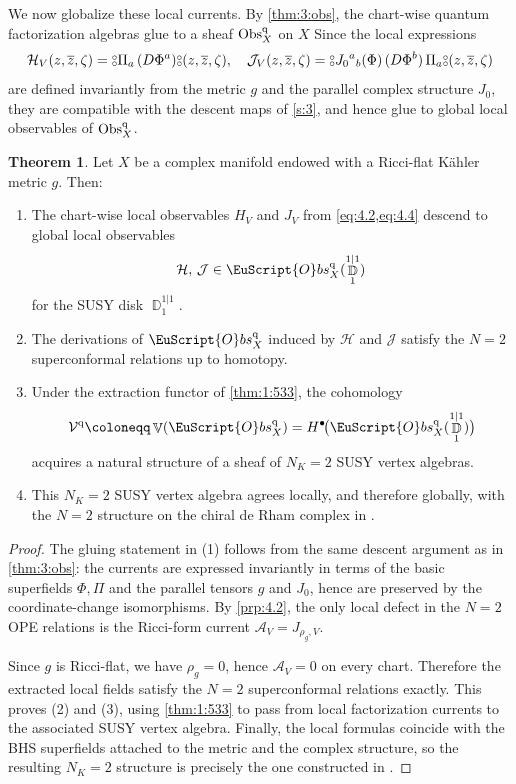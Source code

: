\documentclass[final,reqno]{amsart}
\numberwithin{equation}{section}
\theoremstyle{definition}
\newtheorem{thm}{Theorem}[section]
\newcommand{\ol}{\overline}
\newcommand{\ceq}{\coloneqq} %
\newcommand{\q}{\textup{q}}
\newcommand{\clA}{\mathcal{A}}
\newcommand{\clH}{\mathcal{H}}
\newcommand{\clJ}{\mathcal{J}}
\newcommand{\clV}{\mathcal{V}}
\newcommand{\qObs}[1]{\mathop{\Obs^{\textup{q}}_{#1}}}
\newcommand{\sqObs}[1]{\mathop{\EuScript{O}bs^{\q}_{#1}}}
\newcommand{\dbc}{%
 \mathrel{\vcenter{\hbox{\ooalign{%
  \raisebox{0.5ex}{$\scriptstyle \circ$}\cr%
  \raisebox{-0.5ex}{$\scriptstyle \circ$}%
 }}}}%
}
\newcommand{\nod}[1]{\mathopen{\dbc} \mathrel{#1} \mathclose{\dbc}}
\DeclareMathOperator{\bbD}{\mathbb{D}}
\DeclareMathOperator{\bbV}{\mathbb{V}}
\DeclareMathOperator{\Obs}{Obs}
\begin{document}
We now globalize these local currents. 
By \cref{thm:3:obs}, the chart-wise quantum factorization algebras 
glue to a sheaf $\qObs{X}$ on $X$
Since the local expressions
\[
 \clH_V(z,\ol{z},\zeta) = \nod{ \Pi_a\,(D\Phi^a)}(z,\ol{z},\zeta), \quad
 \clJ_V(z,\ol{z},\zeta) = 
  \nod{ J_0{}^a{}_b(\Phi)\,(D\Phi^b)\,\Pi_a}(z,\ol{z},\zeta)
\]
are defined invariantly from the metric $g$ and 
the parallel complex structure $J_0$, 
they are compatible with the descent maps of \cref{s:3}, 
and hence glue to global local observables of $\qObs{X}$.

\begin{thm}\label{thm:4:N=2}
Let $X$ be a complex manifold endowed with a Ricci-flat K\"ahler metric $g$.
Then:
\begin{enumerate}
\item 
The chart-wise local observables $H_V$ and $J_V$ from
\cref{eq:4.2,eq:4.4} descend to global local observables
\[
 \clH, \, \clJ \in \sqObs{X}(\bbD^{1|1}_1)
\]
for the SUSY disk $\bbD^{1|1}_1$.

\item 
The derivations of $\sqObs{X}$ induced by $\clH$ and $\clJ$ 
satisfy the $N=2$ superconformal relations up to homotopy.

\item 
Under the extraction functor of \cref{thm:1:533}, the cohomology
\[
 \clV^{\q} \ceq \bbV(\sqObs{X}) = 
 H^\bullet\!\bigl(\sqObs{X}(\bbD^{1|1}_1)\bigr)
\]
acquires a natural structure of a sheaf of $N_K=2$ SUSY vertex algebras.

\item 
This $N_K=2$ SUSY vertex algebra agrees locally, and therefore globally,
with the $N=2$ structure on the chiral de Rham complex 
in \cite[Theorem 7.4 (ii)]{BHS}.
\end{enumerate}
\end{thm}

\begin{proof}
The gluing statement in (1) follows from the same descent argument 
as in \cref{thm:3:obs}: 
the currents are expressed invariantly in terms of 
the basic superfields $\Phi,\Pi$ and the parallel tensors $g$ and $J_0$, 
hence are preserved by the coordinate-change isomorphisms. 
By \cref{prp:4.2}, the only local defect in the $N=2$ OPE relations 
is the Ricci-form current $\clA_V = J_{\rho_g,V}$.

Since $g$ is Ricci-flat, we have $\rho_g=0$, 
hence $\clA_V=0$ on every chart. 
Therefore the extracted local fields satisfy 
the $N=2$ superconformal relations exactly. 
This proves (2) and (3), using \cref{thm:1:533} to pass 
from local factorization currents to the associated SUSY vertex algebra. 
Finally, the local formulas coincide with the BHS superfields 
attached to the metric and the complex structure, 
so the resulting $N_K=2$ structure is precisely 
the one constructed in \cite{BHS}.
\end{proof}
\end{document}
